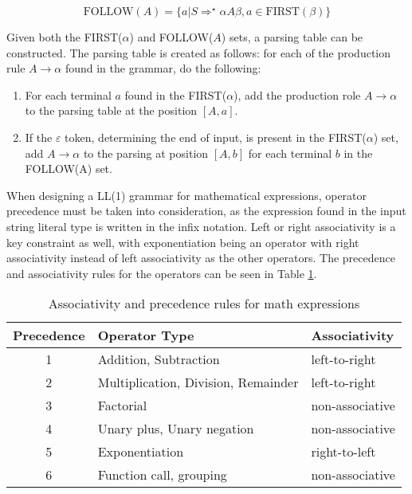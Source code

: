 $$\text{FOLLOW}(A) = \{ a | S \Rightarrow^\star \alpha A\beta, a \in \text{FIRST}(\beta) \} $$

Given both the FIRST($\alpha$) and FOLLOW($A$) sets, a parsing table can be constructed. The parsing table is created as follows: for each of the production rule $A \rightarrow \alpha$ found in the grammar, do the following:

\begin{enumerate}
  \item For each terminal $a$ found in the FIRST($\alpha$), add the production role $A \rightarrow \alpha$ to the parsing table at the position $[A, a]$.
  \item If the $\varepsilon$ token, determining the end of input, is present in the FIRST($\alpha$) set, add $A \rightarrow \alpha$ to the parsing at position $[A, b]$ for each terminal $b$ in the FOLLOW(A) set.
\end{enumerate}

When designing a LL(1) grammar for mathematical expressions, operator precedence must be taken into consideration, as the expression found in the input string literal type is written in the infix notation. Left or right associativity is a key constraint as well, with exponentiation being an operator with right associativity instead of left associativity as the other operators. The precedence and associativity rules for the operators can be seen in Table \ref{table:associativity}.

\clearpage

\begin{table}[ht]
  \centering
  \begin{tabular}{c|l|l}
    \hline
    \textbf{Precedence} & \textbf{Operator Type}              & \textbf{Associativity} \\ \hline
    1                   & Addition, Subtraction               & left-to-right          \\ 
    2                   & Multiplication, Division, Remainder & left-to-right          \\ 
    3                   & Factorial                           & non-associative        \\ 
    4                   & Unary plus, Unary negation          & non-associative        \\ 
    5                   & Exponentiation                      & right-to-left          \\ 
    6                   & Function call, grouping             & non-associative        \\ \hline
  \end{tabular}
  \caption{Associativity and precedence rules for math expressions}
  \label{table:associativity}
\end{table}


